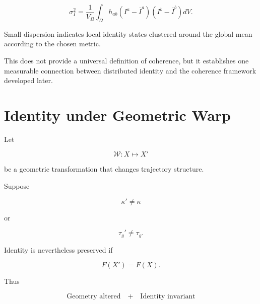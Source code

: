 \documentclass[12pt,oneside]{book}
\newcommand{\Warp}{\mathcal{W}}
\begin{document}
\begin{equation}
    \sigma_I^2
    =
    \frac{1}{V_{\Omega}}
    \int_{\Omega}
        h_{ab}
        \left(
            I^a-\overline{I}^a
        \right)
        \left(
            I^b-\overline{I}^b
        \right)
    dV.
    \label{eq:identity-dispersion}
\end{equation}

Small dispersion indicates local identity states clustered around
the global mean according to the chosen metric.

This does not provide a universal definition of coherence, but
it establishes one measurable connection between distributed
identity and the coherence framework developed later.


\section{Identity under Geometric Warp}
\label{sec:identity-under-warp}

Let

\begin{equation}
    \Warp:
    X
    \longmapsto
    X'
\end{equation}

be a geometric transformation that changes trajectory structure.

Suppose

\begin{equation}
    \kappa'
    \neq
    \kappa
\end{equation}

or

\begin{equation}
    \tau_g'
    \neq
    \tau_g.
\end{equation}

Identity is nevertheless preserved if

\begin{equation}
    F(X')
    =
    F(X).
    \label{eq:warp-identity-invariance}
\end{equation}

Thus

\begin{equation}
    \boxed{
    \text{Geometry altered}
    \quad+\quad
    \text{Identity invariant}
    }
    \label{eq:warp-preserves-identity-box}
\end{equation}
\end{document}
